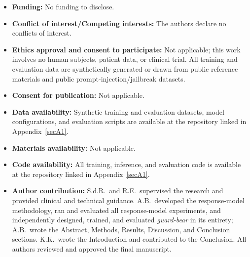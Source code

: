 \documentclass[pdflatex,sn-mathphys-num]{sn-jnl}%
\begin{document}
\begin{itemize}
\item \textbf{Funding:} No funding to disclose.
\item \textbf{Conflict of interest/Competing interests:} The authors declare no conflicts of interest.
\item \textbf{Ethics approval and consent to participate:} Not applicable; this work involves no human subjects, patient data, or clinical trial. All training and evaluation data are synthetically generated or drawn from public reference materials and public prompt-injection/jailbreak datasets.
\item \textbf{Consent for publication:} Not applicable.
\item \textbf{Data availability:} Synthetic training and evaluation datasets, model configurations, and evaluation scripts are available at the repository linked in Appendix~\ref{secA1}.
\item \textbf{Materials availability:} Not applicable.
\item \textbf{Code availability:} All training, inference, and evaluation code is available at the repository linked in Appendix~\ref{secA1}.
\item \textbf{Author contribution:} S.d.R.\ and R.E.\ supervised the research and provided clinical and technical guidance. A.B.\ developed the response-model methodology, ran and evaluated all response-model experiments, and independently designed, trained, and evaluated \textit{guard-bear} in its entirety; A.B.\ wrote the Abstract, Methods, Results, Discussion, and Conclusion sections. K.K.\ wrote the Introduction and contributed to the Conclusion. All authors reviewed and approved the final manuscript.
\end{itemize}
\end{document}
